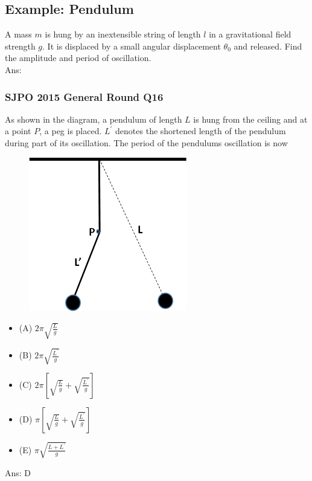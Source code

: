 \documentclass{article}
\begin{document}
\subsection{Example: Pendulum}
A mass $m$ is hung by an inextensible string of length $l$ in a gravitational field strength $g$. It is displaced by a small angular displacement $\theta_0$ and released. Find the amplitude and period of oscillation.\\[10pt]
Ans: \\[50pt]
\begin{samepage}
\subsubsection{SJPO 2015 General Round Q16}
As shown in the diagram, a pendulum of length $L$ is hung from the ceiling and at a point $P$, a peg is placed. $L^{\prime}$ denotes the shortened length of the pendulum during part of its oscillation. The period of the pendulums oscillation is now \\
{
\begin{figure}
\includegraphics[width=0.9\linewidth]{images/2015q16.png}
\end{figure}
\begin{itemize}
\item[](A) $2 \pi \sqrt{\frac{L}{g}}$
\item[](B) $2 \pi \sqrt{\frac{L^{\prime}}{g}}$
\item[](C) $2 \pi\left[\sqrt{\frac{L}{g}}+\sqrt{\frac{L^{\prime}}{g}}\right]$
\item[](D) $\pi\left[\sqrt{\frac{L}{g}}+\sqrt{\frac{L^{\prime}}{g}}\right]$
\item[](E) $\pi \sqrt{\frac{L+L^{\prime}}{g}}$
\end{itemize}
Ans: \ifpaper D \fi
}
\end{samepage}
\end{document}
